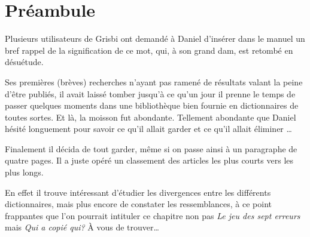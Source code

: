 

\chapter{Préambule\label{preamble}}


Plusieurs utilisateurs de \gls{Grisbi} ont demandé à Daniel  d'insérer dans le manuel un bref rappel de la signification de ce mot, qui, à son grand dam, est retombé en désuétude.

Ses premières (brèves) recherches n'ayant pas ramené de résultats valant la peine d'être publiés, il avait laissé tomber jusqu'à ce qu'un jour il prenne le temps de passer quelques moments dans une bibliothèque bien fournie en dictionnaires de toutes sortes. Et là, la moisson fut abondante. Tellement abondante que Daniel  hésité longuement pour savoir ce qu'il allait garder et ce qu'il allait éliminer  \ldots 

Finalement il décida de tout garder, même si on passe ainsi à un paragraphe de quatre pages. Il a juste opéré un classement des articles les plus courts vers les plus longs.

En effet il trouve intéressant d'étudier les divergences entre les différents dictionnaires, mais plus encore de constater les ressemblances, à ce point frappantes que l'on pourrait intituler ce chapitre non pas \emph{Le jeu des sept erreurs} mais \emph{Qui a copié qui?} À vous de trouver\dots{}


